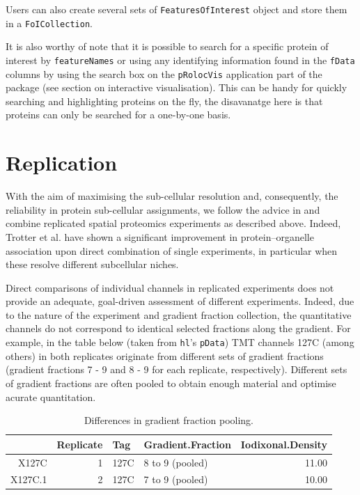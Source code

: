 Users can also create several sets of \texttt{FeaturesOfInterest}
object and store them in a \texttt{FoICollection}.

It is also worthy of note that it is possible to search for a
specific protein of interest by \texttt{featureNames} or using any
identifying information found in the \texttt{fData} columns by using
the search box on the \texttt{pRolocVis} application part of the
 package (see section on interactive
visualisation). This can be handy for quickly searching and
highlighting proteins on the fly, the disavanatge here is that
proteins can only be searched for a one-by-one basis.

\section*{Replication}

With the aim of maximising the sub-cellular resolution and,
consequently, the reliability in protein sub-cellular assignments, we
follow the advice in \cite{Trotter:2010} and combine replicated spatial
proteomics experiments as described above. Indeed, Trotter et
al. have shown a significant improvement in protein–organelle
association upon direct combination of single experiments, in
particular when these resolve different subcellular niches.

Direct comparisons of individual channels in replicated experiments
does not provide an adequate, goal-driven assessment of different
experiments. Indeed, due to the nature of the experiment and gradient
fraction collection, the quantitative channels do not correspond to
identical selected fractions along the gradient. For example, in the
table below (taken from \texttt{hl}'s \texttt{pData}) TMT channels
127C (among others) in both replicates originate from different sets
of gradient fractions (gradient fractions 7 - 9 and 8 - 9 for each
replicate, respectively). Different sets of gradient fractions are
often pooled to obtain enough material and optimise acurate
quantitation.

\begin{table}[ht]
\centering
\begin{tabular}{rrllr}
  \hline
 & Replicate & Tag & Gradient.Fraction & Iodixonal.Density \\ 
  \hline
X127C &   1 & 127C & 8 to 9 (pooled) & 11.00 \\ 
  X127C.1 &   2 & 127C & 7 to 9 (pooled) & 10.00 \\ 
   \hline
\end{tabular}
\caption{Differences in gradient fraction pooling.} 
\label{tab:pdtab}
\end{table}


